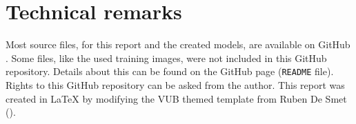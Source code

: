 

\section{Technical remarks}
\label{section:technical_remarks}

Most source files, for this report and the created models, are available on GitHub \citep{github_project}. Some files, like the used training images, were not included in this GitHub repository. Details about this can be found on the GitHub page (\texttt{README} file). Rights to this GitHub repository can be asked from the author. This report was created in \LaTeX{} by modifying the VUB themed template from Ruben De Smet (\citeyear{latex_template}).